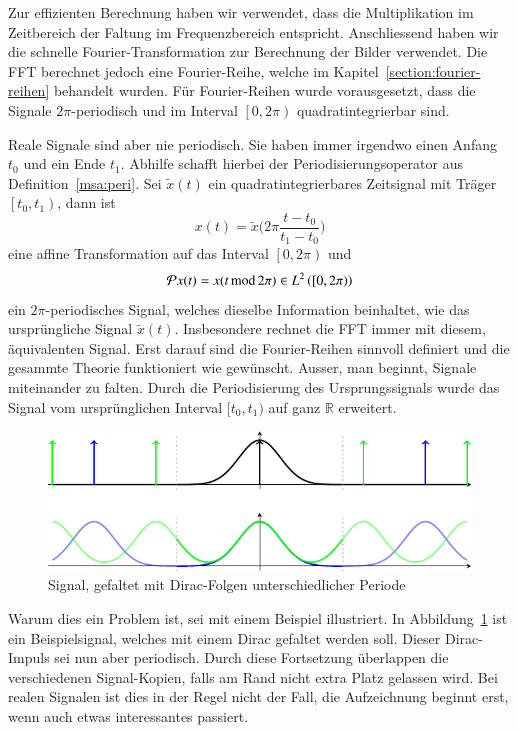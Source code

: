 
Zur effizienten Berechnung haben wir verwendet, dass die Multiplikation im Zeitbereich der Faltung im Frequenzbereich entspricht.
Anschliessend haben wir die schnelle Fourier-Transformation zur Berechnung der Bilder verwendet.
Die FFT berechnet jedoch eine Fourier-Reihe, welche im Kapitel~\ref{section:fourier-reihen} behandelt wurden.
Für Fourier-Reihen wurde vorausgesetzt, dass die Signale $2\pi$-periodisch und im Interval $\left[0, 2\pi\right)$ quadratintegrierbar sind.

Reale Signale sind aber nie periodisch.
Sie haben immer irgendwo einen Anfang $t_0$ und ein Ende $t_1$.
Abhilfe schafft hierbei der Periodisierungsoperator aus Definition~\ref{msa:peri}.
Sei $\tilde{x}(t)$ ein quadratintegrierbares Zeitsignal mit Träger $\left[t_0, t_1\right)$, dann ist
\[
	x(t) = \tilde{x}\biggl(2\pi\frac{t-t_0}{t_1-t_0}\biggr)
\]
eine affine Transformation auf das Interval $\left[0, 2\pi \right)$ und
\[
	\Peri x(t) = x( t \,\text{mod}\, 2\pi) \in L^2\left(\left[0, 2\pi \right)\right)
\]
ein $2\pi$-periodisches Signal, welches dieselbe Information beinhaltet, wie das ursprüngliche Signal $\tilde{x}(t)$.
Insbesondere rechnet die FFT immer mit diesem, äquivalenten Signal.
Erst darauf sind die Fourier-Reihen sinnvoll definiert und die gesammte Theorie funktioniert wie gewünscht.
Ausser, man beginnt, Signale miteinander zu falten.
Durch die Periodisierung des Ursprungssignals wurde das Signal vom ursprünglichen Interval $[t_0, t_1)$ auf ganz $\mathbb{R}$ erweitert.

\begin{figure}
	\centering
	\includegraphics{papers/complex/images/cyclic_conv.pdf}
	\caption{Signal, gefaltet mit Dirac-Folgen unterschiedlicher Periode}
	\label{complex:cyclic-conv}
\end{figure}

Warum dies ein Problem ist, sei mit einem Beispiel illustriert.
In Abbildung~\ref{complex:cyclic-conv} ist ein Beispielsignal, welches mit einem Dirac gefaltet werden soll.
Dieser Dirac-Impuls sei nun aber periodisch.
Durch diese Fortsetzung überlappen die verschiedenen Signal-Kopien, falls am Rand nicht extra Platz gelassen wird.
Bei realen Signalen ist dies in der Regel nicht der Fall, die Aufzeichnung beginnt erst, wenn auch etwas interessantes passiert.

